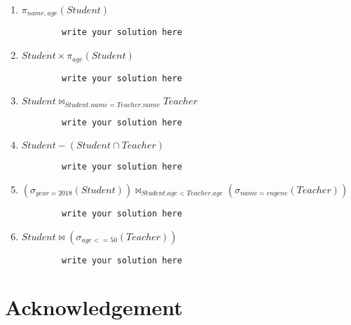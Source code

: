 \documentclass{article}
\begin{document}
\begin{enumerate}
    \item $\pi _{name,age}(Student)$
    \begin{lstlisting}
        write your solution here
    \end{lstlisting}
    
    \item $Student \times \pi_{age}(Student)$
    \begin{lstlisting}
        write your solution here 
    \end{lstlisting}
    
    \item $Student \bowtie_{Student.name=Teacher.name} Teacher $
    \begin{lstlisting}
        write your solution here 
    \end{lstlisting}
    
    \item $Student - (Student \cap Teacher)$
    \begin{lstlisting}
        write your solution here 
    \end{lstlisting}
    
    \item $(\sigma_{year=2018}(Student) )\bowtie_{Student.age < Teacher.age} (\sigma_{name=engene}(Teacher))$
    \begin{lstlisting}
        write your solution here 
    \end{lstlisting}
    
    \item $Student \bowtie (\sigma_{age<=50}(Teacher))$
    \begin{lstlisting}
        write your solution here 
    \end{lstlisting}
\end{enumerate}


\newpage
\section{Acknowledgement}
\end{document}
